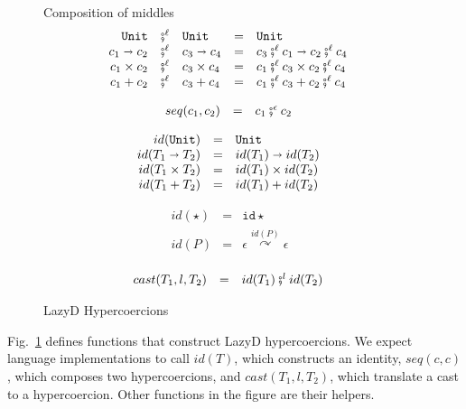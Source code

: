 \documentclass[acmsmall,review,anonymous]{acmart}\settopmatter{printfolios=true,printccs=false,printacmref=false}
\newcommand{\figref}[1]{Fig.~\ref{#1}}
\newcommand{\funrule}[3]{#1 &=& #2 & #3\\}
\newcommand{\comprule}[4]{#1 & \fatsemi^\ell & #2 & = & #3 & #4 \\}
\newcommand{\plus}[0]{+}
\newcommand{\lazyD}{Lazy\;D}
\newcommand{\POOunit}[0]{\mathtt{Unit}}
\newcommand{\POOfun}[2]{#1 \shortrightarrow #2}
\newcommand{\POOprod}[2]{#1 \times #2}
\newcommand{\POOsum}[2]{#1 \plus #2}
\newcommand{\hyperCoercionI}[0]{\mathtt{id\star}}
\newcommand{\hyperCoercionC}[3]{#1 \overset{#2}{\curvearrowright} #3}
\begin{document}
\begin{figure}
	Composition of middles 
	\[ 
	\begin{array}{rclclr}
	\comprule{\POOunit}{\POOunit}{
		\POOunit
	}{}
	\comprule{\POOfun{c_1}{c_2}}{\POOfun{c_3}{c_4}}{
		\POOfun{c_3 \fatsemi^{\ell} c_1}{c_2 \fatsemi^\ell c_4}
	}{}
	\comprule{\POOprod{c_1}{c_2}}{\POOprod{c_3}{c_4}}{
		\POOprod{c_1 \fatsemi^\ell c_3}{c_2 \fatsemi^\ell c_4}
	}{}
	\comprule{\POOsum{c_1}{c_2}}{\POOsum{c_3}{c_4}}{
		\POOsum{c_1 \fatsemi^\ell c_3}{c_2 \fatsemi^\ell c_4}
	}{}
	\end{array}
	\]
	
	\[
	\begin{array}{rclr}
	\funrule{seq(c_1,c_2)}{
		c_1 \fatsemi^\epsilon c_2
	}{}
	\end{array}
	\]
	
	\[
	\begin{array}{rclr}
	\funrule{id(\POOunit)}{\POOunit}{}
	\funrule{id(\POOfun{T_1}{T_2})}{
		\POOfun{id(T_1)}{id(T_2)}
	}{}
	\funrule{id(\POOprod{T_1}{T_2})}{
		\POOprod{id(T_1)}{id(T_2)}
	}{}
	\funrule{id(\POOsum{T_1}{T_2})}{
		\POOsum{id(T_1)}{id(T_2)}
	}{}
	\end{array}
	\]
	
	\[
	\begin{array}{rclr}
	\funrule{id(\star)}{
		\hyperCoercionI
	}{}
	\funrule{id(P)}{
		\hyperCoercionC{\epsilon}{id(P)}{\epsilon}
	}{}
	\end{array}
	\]
	
	\[
	\begin{array}{rclr}
	\funrule{cast(T_1,l,T_2)}{
		id(T_1) \fatsemi^l id(T_2)
	}{}
	\end{array}
	\]
	\caption{\lazyD{} Hypercoercions}
	\label{fig:HC-D}
\end{figure}

\figref{fig:HC-D} defines functions that construct \lazyD{} hypercoercions. We 
expect language implementations to call $id(T)$, which constructs an 
identity, $seq(c,c)$, which composes two hypercoercions, and $
cast(T_1,l,T_2)$, which translate a cast to a hypercoercion. Other functions 
in the figure are their helpers.
\end{document}
